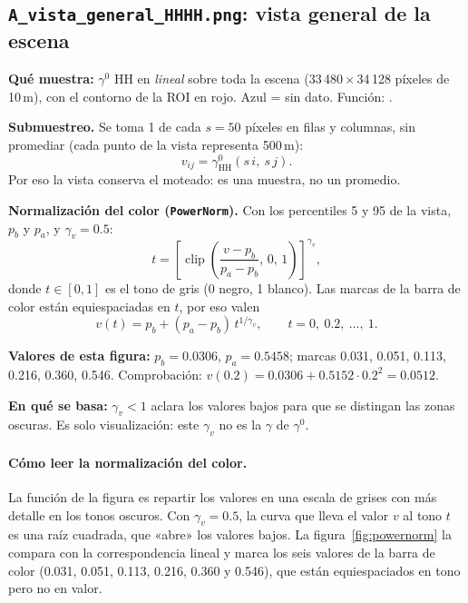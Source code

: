 \documentclass[11pt,a4paper]{article}
\newcommand{\gz}{\ensuremath{\gamma^{0}}}
\newcommand{\por}{\ensuremath{\times}}
\begin{document}
\subsection{\texttt{A\_vista\_general\_HHHH.png}: vista general de la escena}

\textbf{Qué muestra:} \gz{} HH en \emph{lineal} sobre toda la escena (33\,480\,\por\,34\,128 píxeles de 10\,m), con el contorno de la
ROI en rojo. Azul = sin dato. Función: .

\textbf{Submuestreo.} Se toma 1 de cada $s = 50$ píxeles en filas y columnas, sin promediar (cada punto de la vista representa 500\,m):
\begin{equation}
  v_{ij} = \gamma^0_{\text{HH}}(s\,i,\ s\,j).
\end{equation}
Por eso la vista conserva el moteado: es una muestra, no un promedio.

\textbf{Normalización del color (\texttt{PowerNorm}).} Con los percentiles 5 y 95 de la vista, $p_b$ y $p_a$, y $\gamma_v = 0.5$:
\begin{equation}
  t = \left[\operatorname{clip}\!\left(\frac{v - p_b}{p_a - p_b},\, 0,\, 1\right)\right]^{\gamma_v},
\end{equation}
donde $t\in[0,1]$ es el tono de gris (0 negro, 1 blanco). Las marcas de la barra de color están equiespaciadas en $t$, por eso valen
\begin{equation}
  v(t) = p_b + (p_a - p_b)\, t^{1/\gamma_v}, \qquad t = 0,\ 0.2,\ \ldots,\ 1 .
\end{equation}

\textbf{Valores de esta figura:} $p_b = 0.0306$, $p_a = 0.5458$; marcas 0.031, 0.051, 0.113, 0.216, 0.360, 0.546. Comprobación:
$v(0.2) = 0.0306 + 0.5152\cdot 0.2^{2} = 0.0512$.

\textbf{En qué se basa:} $\gamma_v < 1$ aclara los valores bajos para que se distingan las zonas oscuras. Es solo visualización: este
$\gamma_v$ no es la $\gamma$ de \gz.

\paragraph{Cómo leer la normalización del color.} La función de la figura es repartir los valores en una escala
de grises con más detalle en los tonos oscuros. Con $\gamma_v=0.5$, la curva que lleva el valor $v$ al tono
$t$ es una raíz cuadrada, que «abre» los valores bajos. La figura~\ref{fig:powernorm} la compara con la
correspondencia lineal y marca los seis valores de la barra de color (0.031, 0.051, 0.113, 0.216, 0.360 y
0.546), que están equiespaciados en tono pero no en valor.
\end{document}
